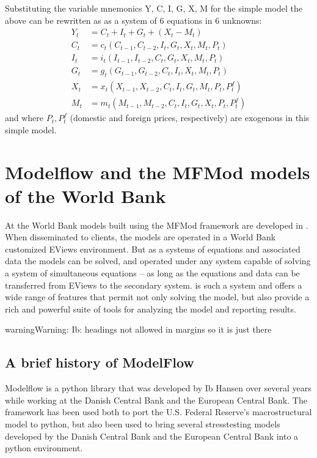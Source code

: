 \documentclass[letterpaper,10pt,english]{jupyterBook}
\begin{document}
\sphinxAtStartPar
Substituting the variable mnemonics Y, C, I, G, X, M for the simple model the above can be rewritten as as a system of 6 equations in 6 unknowns:
\begin{align*}
Y_t  &=  C_t+I_t+G_t+ (X_t-M_t) \\
C_t &= c_t(C_{t-1},C_{t-2},I_t,G_t,X_t,M_t,P_t)\\
I_t &= i_t(I_{t-1},I_{t-2},C_t,G_t,X_t,M_t,P_t)\\
G_t &= g_t(G_{t-1},G_{t-2},C_t,I_t,X_t,M_t,P_t)\\
X_t &= x_t(X_{t-1},X_{t-2},C_t,I_t,G_t,M_t,P_t,P^f_t)\\
M_t &= m_t(M_{t-1},M_{t-2},C_t,I_t,G_t,X_t,P_t,P^f_t)
\end{align*}
\sphinxAtStartPar
and where \(P_t, P^f_t\) (domestic and foreign prices, respectively) are exogenous in this simple model.

\sphinxstepscope


\chapter{Modelflow and the MFMod models of the World Bank}
\label{\detokenize{content/02_MacrostructuralModels/MFModAndModelFlow:modelflow-and-the-mfmod-models-of-the-world-bank}}\label{\detokenize{content/02_MacrostructuralModels/MFModAndModelFlow::doc}}
\sphinxAtStartPar
At the World Bank models built using the MFMod framework are developed in . When disseminated to clients, the models are operated in a World Bank customized EViews environment. But as a systems of equations and associated data the models can be solved, and operated under any system capable of solving a system of simultaneous equations – as long as the equations and data can be transferred from EViews to the secondary system.  is such a system and offers a wide range of features that permit not only solving the model, but also provide a rich and powerful suite of tools for analyzing the model and reporting results.

\begin{sphinxadmonition}{warning}{Warning:}
\sphinxAtStartPar
Ib: headings not allowed in margins so it is just there
\end{sphinxadmonition}


\section{A brief history of ModelFlow}
\label{\detokenize{content/02_MacrostructuralModels/MFModAndModelFlow:a-brief-history-of-modelflow}}
\sphinxAtStartPar
Modelflow is a python library that was developed by Ib Hansen over several years while working at the Danish Central Bank and the European Central Bank. The framework has been used both to port the U.S. Federal Reserve’s macro\sphinxhyphen{}structural  model to python, but also been used to bring several stress\sphinxhyphen{}testing models developed by the Danish Central Bank and the European Central Bank into a python environment.
\end{document}
